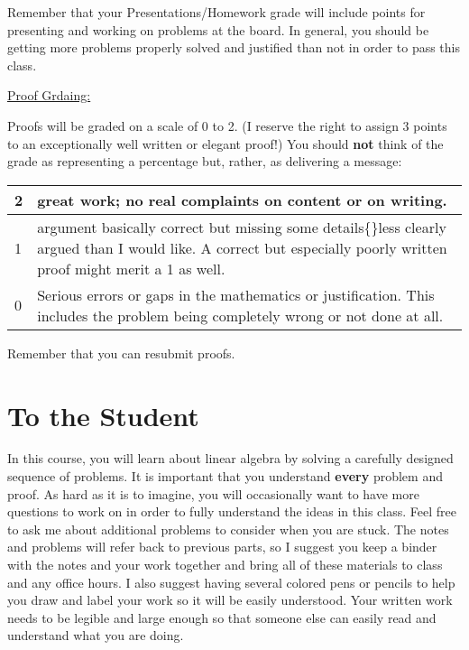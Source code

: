 \begin{annotation}
Remember that your Presentations/Homework grade will include points for presenting and working on problems at the board. In general, you should be getting more problems properly solved and justified than not in order to pass this class.

\underline{Proof Grdaing:}

Proofs will be graded on a scale of 0 to 2. (I reserve the right to assign 3 points to an exceptionally well written or elegant proof!) You should \textbf{not} think of the grade as representing a percentage but, rather, as delivering a message:
\newline
\begin{tabular}{|l|p{11cm}|}
\hline
2 & great work; no real complaints on content or on writing.\\
\hline
1 & argument basically correct but missing some details\{\}less clearly argued than I would like. A correct but especially poorly written proof might merit a 1 as well.\\
\hline
0 & Serious errors or gaps in the mathematics or justification. This includes the problem being completely wrong or not done at all.\\
\hline
\end{tabular}

Remember that you can resubmit proofs.

\end{annotation}

\chapter{To the Student}

In this course, you will learn about linear algebra by solving a carefully designed sequence of problems.  It is important that you understand \textbf{every} problem and proof. As hard as it is to imagine, you will occasionally want to have more questions to work on in order to fully understand the ideas in this class. Feel free to ask me about additional problems to consider when you are stuck. The notes and problems will refer back to previous parts, so I suggest you keep a binder with the notes and your work together and bring all of these materials to class and any office hours. I also suggest having several colored pens or pencils to help you draw and label your work so it will be easily understood. Your written work needs to be legible and large enough so that someone else can easily read and understand what you are doing.

